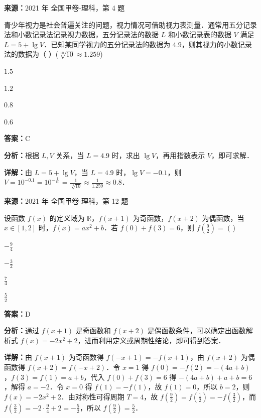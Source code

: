 \begin{question}[points=5]
\textbf{来源：}2021 年 全国甲卷-理科，第 4 题\par
青少年视力是社会普遍关注的问题，视力情况可借助视力表测量．通常用五分记录法和小数记录法记录视力数据，五分记录法的数据 $L$ 和小数记录表的数据 $V$ 满足 $L = 5 + \lg V$．已知某同学视力的五分记录法的数据为 $4.9$，则其视力的小数记录法的数据为（ ）($\sqrt[10]{10} \approx 1.259$)
\begin{choices}
  \item $1.5$
  \item $1.2$
  \item $0.8$
  \item $0.6$
\end{choices}
\begin{solution}
\textbf{答案：}C

\textbf{分析：}根据 $L,V$ 关系，当 $L=4.9$ 时，求出 $\lg V$，再用指数表示 $V$，即可求解．

\textbf{详解：}由 $L=5+\lg V$，当 $L=4.9$ 时，$\lg V = -0.1$，则 $V = 10^{-0.1} = 10^{-\frac{1}{10}} = \frac{1}{\sqrt[10]{10}} \approx \frac{1}{1.259} \approx 0.8$．
\end{solution}
\end{question}

\begin{question}[points=5]
\textbf{来源：}2021 年 全国甲卷-理科，第 12 题\par
设函数 $f(x)$ 的定义域为 $\mathbb{R}$，$f(x+1)$ 为奇函数，$f(x+2)$ 为偶函数，当 $x \in [1,2]$ 时，$f(x) = ax^2 + b$．若 $f(0) + f(3) = 6$，则 $f\left(\frac{9}{2}\right) =$ ( )
\begin{choices}
  \item $-\frac{9}{4}$
  \item $-\frac{3}{2}$
  \item $\frac{7}{4}$
  \item $\frac{5}{2}$
\end{choices}
\begin{solution}
\textbf{答案：}D

\textbf{分析：}通过 $f(x+1)$ 是奇函数和 $f(x+2)$ 是偶函数条件，可以确定出函数解析式 $f(x) = -2x^2 + 2$，进而利用定义或周期性结论，即可得到答案．

\textbf{详解：}由 $f(x+1)$ 为奇函数得 $f(-x+1) = -f(x+1)$，由 $f(x+2)$ 为偶函数得 $f(x+2) = f(-x+2)$．令 $x=1$ 得 $f(0) = -f(2) = -(4a+b)$，$f(3) = f(1) = a+b$，代入 $f(0)+f(3)=6$ 得 $-(4a+b)+a+b=6$，解得 $a=-2$．令 $x=0$ 得 $f(1)=-f(1)$，故 $f(1)=0$，所以 $b=2$，则 $f(x) = -2x^2+2$．由对称性可得周期 $T=4$，故 $f\left(\frac{9}{2}\right) = f\left(\frac{1}{2}\right) = -f\left(\frac{3}{2}\right)$，而 $f\left(\frac{3}{2}\right) = -2\cdot\frac{9}{4}+2 = -\frac{5}{2}$，所以 $f\left(\frac{9}{2}\right) = \frac{5}{2}$．
\end{solution}
\end{question}

